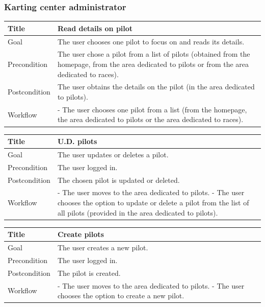 \documentclass{beamer}
\begin{document}
\begin{frame}
    \frametitle{Karting center administrator}
    \begin{table}
        \tiny
        \begin{tabular}{|p{2cm}|p{6cm}|}
        \hline  
        Title & \textbf{Read details on pilot} \\
        \hline
        Goal & The user chooses one pilot to focus on and reads its details. \\
        \hline
        Precondition & The user chose a pilot from a list of pilots (obtained from the homepage,
        from the area dedicated to pilots
        or from the area dedicated to races).\\
        \hline
        Postcondition & The user obtains the details on the pilot (in the area dedicated to pilots). \\
        \hline
        Workflow &
        - The user chooses one pilot from a list (from the homepage, the area dedicated to pilots or 
        the area dedicated to races). \\
        \hline
        \end{tabular}
\end{table}

\begin{table}
    \tiny
    \begin{tabular}{|p{2cm}|p{6cm}|}
    \hline  
    Title & \textbf{U.D. pilots} \\
    \hline
    Goal & The user updates or deletes a pilot. \\
    \hline
    Precondition & The user logged in. \\
    \hline
    Postcondition & The chosen pilot is updated or deleted. \\
    \hline
    Workflow &
    - The user moves to the area dedicated to pilots. \newline
    - The user chooses the option to update or delete a pilot from 
    the list of all pilots (provided in the area dedicated to pilots). \\
    \hline
    \end{tabular}
\end{table}

\begin{table}
\tiny
\begin{tabular}{|p{2cm}|p{6cm}|}
\hline  
Title & \textbf{Create pilots} \\
\hline
Goal & The user creates a new pilot. \\
\hline
Precondition & The user logged in. \\
\hline
Postcondition & The pilot is created. \\
\hline
Workflow &
- The user moves to the area dedicated to pilots. \newline
- The user chooses the option to create a new pilot. \\
\hline
\end{tabular}
\end{table}
\end{frame}
\end{document}
